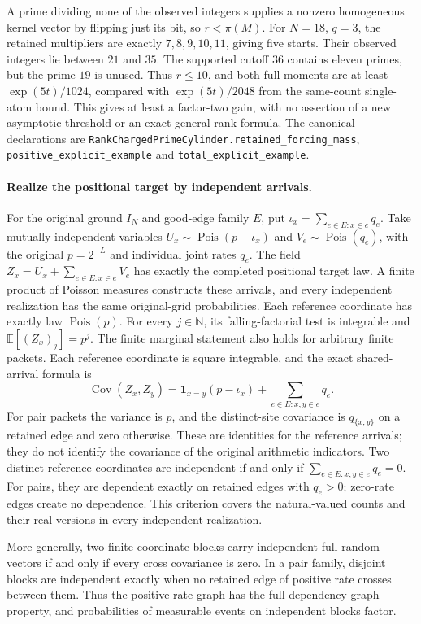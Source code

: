 A prime dividing none of the observed integers supplies a nonzero
homogeneous kernel vector by flipping just its bit, so $r<\pi(M)$.
For $N=18$, $q=3$, the retained multipliers are exactly $7,8,9,10,11$,
giving five starts.  Their observed integers lie between $21$ and $35$.
The supported cutoff $36$ contains eleven primes, but the prime $19$
is unused.  Thus $r\leq10$, and both full moments are at least
$\exp(5t)/1024$, compared with $\exp(5t)/2048$ from the same-count
single-atom bound.  This gives at least a factor-two gain, with no
assertion of a new asymptotic threshold or an exact general rank formula.
The canonical declarations are
\texttt{RankChargedPrimeCylinder.retained\_forcing\_mass},
\texttt{positive\_explicit\_example} and \texttt{total\_explicit\_example}.

\paragraph{Realize the positional target by independent arrivals.}
For the original ground $I_N$ and good-edge family $E$, put
$\iota_x=\sum_{e\in E:x\in e}q_e$.
Take mutually independent variables
$U_x\sim\operatorname{Pois}(p-\iota_x)$ and
$V_e\sim\operatorname{Pois}(q_e)$, with the original $p=2^{-L}$
and individual joint rates $q_e$.
The field $Z_x=U_x+\sum_{e\in E:x\in e}V_e$ has exactly the
completed positional target law.  A finite product of Poisson measures
constructs these arrivals, and every independent realization has the
same original-grid probabilities.  Each reference coordinate has exactly
law $\operatorname{Pois}(p)$.  For every $j\in\mathbb N$, its falling-factorial
test is integrable and $\mathbb E[(Z_x)_j]=p^j$.  The finite marginal
statement also holds for arbitrary finite packets. Each reference coordinate
is square integrable, and the exact shared-arrival formula is
\[
 \operatorname{Cov}(Z_x,Z_y)=\boldsymbol{1}_{x=y}(p-\iota_x)
       +\sum_{e\in E:x,y\in e}q_e.
\]
For pair packets the variance is $p$, and the distinct-site covariance is
$q_{\{x,y\}}$ on a retained edge and zero otherwise. These are identities
for the reference arrivals; they do not identify the covariance of the
original arithmetic indicators. Two distinct reference coordinates are
independent if and only if $\sum_{e\in E:x,y\in e}q_e=0$. For pairs,
they are dependent exactly on retained edges with $q_e>0$; zero-rate
edges create no dependence. This criterion covers the natural-valued
counts and their real versions in every independent realization.

More generally, two finite coordinate blocks carry independent full random
vectors if and only if every cross covariance is zero. In a pair family,
disjoint blocks are independent exactly when no retained edge of positive
rate crosses between them. Thus the positive-rate graph has the full
dependency-graph property, and probabilities of measurable events on
independent blocks factor.


